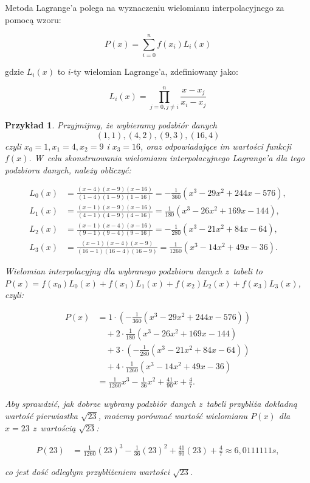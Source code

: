 \documentclass[12pt]{article}
\newtheorem{example}{Przykład}
\begin{document}
Metoda Lagrange'a polega na wyznaczeniu wielomianu interpolacyjnego za pomocą wzoru:

\begin{equation*}
P(x) = \sum_{i=0}^{n} f(x_i) L_i(x)
\end{equation*}

gdzie $L_i(x)$ to $i$-ty wielomian Lagrange'a, zdefiniowany jako:

\begin{equation*}
L_i(x) = \prod_{j=0, j\neq i}^{n} \frac{x-x_j}{x_i-x_j}
\end{equation*}

\begin{example}

Przyjmijmy, że wybieramy podzbiór danych $${(1,1), (4,2), (9,3), (16,4)}$$ czyli $x_0=1, x_1=4, x_2=9$ i $x_3=16$, oraz odpowiadające im wartości funkcji $f(x)$. W~celu skonstruowania wielomianu interpolacyjnego Lagrange'a dla tego podzbioru danych, należy obliczyć:

\begin{align*}
L_0(x) &= \frac{(x-4)(x-9)(x-16)}{(1-4)(1-9)(1-16)} = -\frac{1}{360}(x^3 - 29x^2 + 244x - 576), \\
L_1(x) &= \frac{(x-1)(x-9)(x-16)}{(4-1)(4-9)(4-16)} = \frac{1}{180}(x^3 - 26x^2 + 169x - 144), \\
L_2(x) &= \frac{(x-1)(x-4)(x-16)}{(9-1)(9-4)(9-16)} = -\frac{1}{280}(x^3 - 21x^2 + 84x - 64), \\
L_3(x) &= \frac{(x-1)(x-4)(x-9)}{(16-1)(16-4)(16-9)} = \frac{1}{1260}(x^3 - 14x^2 + 49x - 36).
\end{align*}

Wielomian interpolacyjny dla wybranego podzbioru danych z~tabeli to \\ $P(x) = f(x_0)L_0(x) + f(x_1)L_1(x) + f(x_2)L_2(x) + f(x_3)L_3(x)$, czyli:

\begin{align*}
P(x) &= 1\cdot\left(-\frac{1}{360}(x^3 - 29x^2 + 244x - 576)\right) \\
&\quad + 2\cdot\frac{1}{180}(x^3 - 26x^2 + 169x - 144) \\
&\quad + 3\cdot\left(-\frac{1}{280}(x^3 - 21x^2 + 84x - 64)\right) \\
&\quad + 4\cdot\frac{1}{1260}(x^3 - 14x^2 + 49x - 36) \\
&= \frac{1}{1260}x^3 - \frac{1}{36}x^2 + \frac{41}{90}x + \frac{4}{7}.
\end{align*}

Aby sprawdzić, jak dobrze wybrany podzbiór danych z~tabeli przybliża dokładną wartość pierwiastka $\sqrt{23}$, możemy porównać wartość wielomianu $P(x)$ dla $x=23$ z~wartością $\sqrt{23}$:

\begin{align*}
P(23) &= \frac{1}{1260}(23)^3 - \frac{1}{36}(23)^2 + \frac{41}{90}(23) + \frac{4}{7} \approx 6,0111111s,
\end{align*}

co jest dość odległym przybliżeniem wartości $\sqrt{23}$.

\end{example}
\end{document}
